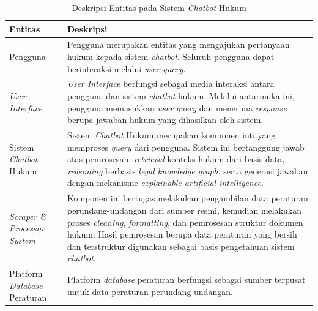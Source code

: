 \begin{table}[H]
\centering
\caption{Deskripsi Entitas pada Sistem \emph{Chatbot} Hukum}
\label{tab:entities}
\small
\begin{tabularx}{\textwidth}{|p{}|X|}
\hline
\textbf{Entitas} & \textbf{Deskripsi} \\
\hline
Pengguna & Pengguna merupakan entitas yang mengajukan pertanyaan hukum kepada sistem \emph{chatbot}. Seluruh pengguna dapat berinteraksi melalui \emph{user query}. \\
\hline
\emph{User Interface} & \emph{User Interface} berfungsi sebagai media interaksi antara pengguna dan sistem \emph{chatbot} hukum. Melalui antarmuka ini, pengguna memasukkan \emph{user query} dan menerima \emph{response} berupa jawaban hukum yang dihasilkan oleh sistem. \\
\hline
Sistem \emph{Chatbot} Hukum & Sistem \emph{Chatbot} Hukum merupakan komponen inti yang memproses \emph{query} dari pengguna. Sistem ini bertanggung jawab atas pemrosesan, \emph{retrieval} konteks hukum dari basis data, \emph{reasoning} berbasis \emph{legal knowledge graph}, serta generasi jawaban dengan mekanisme \emph{explainable artificial intelligence}. \\
\hline
\emph{Scraper \& Processor System} & Komponen ini bertugas melakukan pengambilan data peraturan perundang-undangan dari sumber resmi, kemudian melakukan proses \emph{cleaning}, \emph{formatting}, dan pemrosesan struktur dokumen hukum. Hasil pemrosesan berupa data peraturan yang bersih dan terstruktur digunakan sebagai basis pengetahuan sistem \emph{chatbot}. \\
\hline
Platform \emph{Database} Peraturan & Platform \emph{database} peraturan berfungsi sebagai sumber terpusat untuk data peraturan perundang-undangan. \\
\hline
\end{tabularx}
\end{table}

